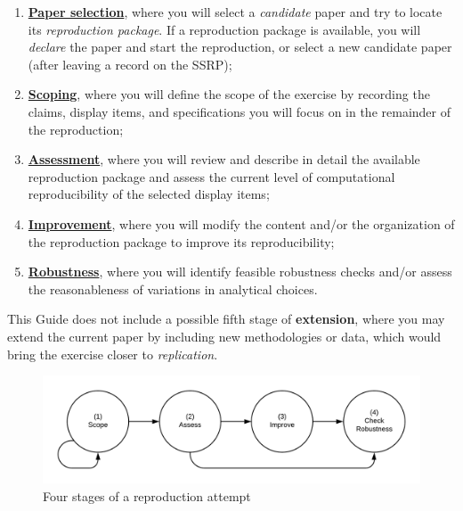 \documentclass[
]{book}
\providecommand{\tightlist}{%
  \setlength{\itemsep}{0pt}\setlength{\parskip}{0pt}}
\begin{document}
\begin{enumerate}
\def\labelenumi{\arabic{enumi}.}
\setcounter{enumi}{-1}
\tightlist
\item
  \protect\hyperlink{select}{\textbf{Paper selection}}, where you will select a \emph{candidate} paper and try to locate its \emph{reproduction package}. If a reproduction package is available, you will \emph{declare} the paper and start the reproduction, or select a new candidate paper (after leaving a record on the SSRP);\\
\item
  \protect\hyperlink{scoping}{\textbf{Scoping}}, where you will define the scope of the exercise by recording the claims, display items, and specifications you will focus on in the remainder of the reproduction;\\
\item
  \protect\hyperlink{assessment}{\textbf{Assessment}}, where you will review and describe in detail the available reproduction package and assess the current level of computational reproducibility of the selected display items;
\item
  \protect\hyperlink{improvements}{\textbf{Improvement}}, where you will modify the content and/or the organization of the reproduction package to improve its reproducibility;\\
\item
  \protect\hyperlink{robust}{\textbf{Robustness}}, where you will identify feasible robustness checks and/or assess the reasonableness of variations in analytical choices.
\end{enumerate}

This Guide does not include a possible fifth stage of \textbf{extension}, where you may extend the current paper by including new methodologies or data, which would bring the exercise closer to \emph{replication}.

\begin{figure}
\includegraphics[width=1\linewidth]{stages} \caption{Four stages of a reproduction attempt}\label{fig:stages-intro}
\end{figure}
\end{document}
